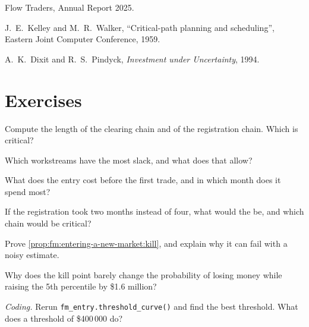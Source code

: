 \begin{omsources}
\item Flow Traders, Annual Report 2025.
\item J.~E.~Kelley and M.~R.~Walker, ``Critical-path planning and scheduling'', Eastern Joint Computer Conference, 1959.
\item A.~K.~Dixit and R.~S.~Pindyck, \emph{Investment under Uncertainty}, 1994.
\end{omsources}

\section{Exercises}

\begin{exercise}[$\star$]\label{exo:fm:entering-a-new-market:1}
Compute the length of the clearing chain and of the registration chain. Which is critical?
\end{exercise}

\begin{exercise}[$\star$]\label{exo:fm:entering-a-new-market:2}
Which workstreams have the most slack, and what does that allow?
\end{exercise}

\begin{exercise}[$\star$]\label{exo:fm:entering-a-new-market:3}
What does the entry cost before the first trade, and in which month does it spend most?
\end{exercise}

\begin{exercise}[$\star\star$]\label{exo:fm:entering-a-new-market:4}
If the registration took two months instead of four, what would the  be, and which chain would be critical?
\end{exercise}

\begin{exercise}[$\star\star$]\label{exo:fm:entering-a-new-market:5}
Prove \cref{prop:fm:entering-a-new-market:kill}, and explain why it can fail with a noisy estimate.
\end{exercise}

\begin{exercise}[$\star\star$]\label{exo:fm:entering-a-new-market:6}
Why does the kill point barely change the probability of losing money while raising the 5th percentile by \$1.6 million?
\end{exercise}

\begin{exercise}[$\star\star\star$]\label{exo:fm:entering-a-new-market:7}
\emph{Coding.} Rerun \texttt{fm\_entry.threshold\_curve()} and find the best threshold. What does a threshold of \$400\,000 do?
\end{exercise}


